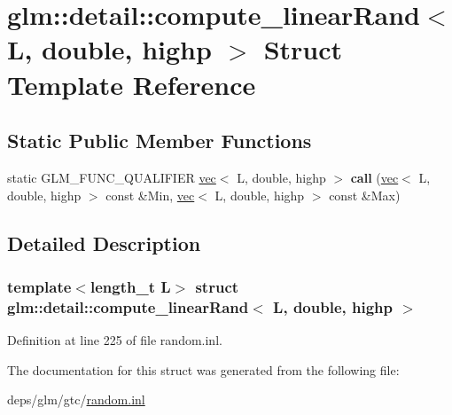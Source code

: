 \hypertarget{structglm_1_1detail_1_1compute__linearRand_3_01L_00_01double_00_01highp_01_4}{}\section{glm\+:\+:detail\+:\+:compute\+\_\+linear\+Rand$<$ L, double, highp $>$ Struct Template Reference}
\label{structglm_1_1detail_1_1compute__linearRand_3_01L_00_01double_00_01highp_01_4}
\subsection*{Static Public Member Functions}
\begin{DoxyCompactItemize}
\item 
\mbox{\label{structglm_1_1detail_1_1compute__linearRand_3_01L_00_01double_00_01highp_01_4_a4e13e9eedd0fca45fa2e381f38e858c1}} 
static G\+L\+M\+\_\+\+F\+U\+N\+C\+\_\+\+Q\+U\+A\+L\+I\+F\+I\+ER \hyperlink{structglm_1_1vec}{vec}$<$ L, double, highp $>$ {\bfseries call} (\hyperlink{structglm_1_1vec}{vec}$<$ L, double, highp $>$ const \&Min, \hyperlink{structglm_1_1vec}{vec}$<$ L, double, highp $>$ const \&Max)
\end{DoxyCompactItemize}


\subsection{Detailed Description}
\subsubsection*{template$<$length\+\_\+t L$>$\newline
struct glm\+::detail\+::compute\+\_\+linear\+Rand$<$ L, double, highp $>$}



Definition at line 225 of file random.\+inl.



The documentation for this struct was generated from the following file\+:\begin{DoxyCompactItemize}
\item 
deps/glm/gtc/\hyperlink{random_8inl}{random.\+inl}\end{DoxyCompactItemize}
